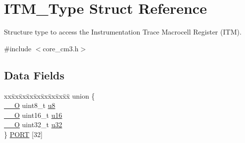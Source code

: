\hypertarget{struct_i_t_m___type}{}\section{I\+T\+M\+\_\+\+Type Struct Reference}
\label{struct_i_t_m___type}


Structure type to access the Instrumentation Trace Macrocell Register (I\+TM).  




{\ttfamily \#include $<$core\+\_\+cm3.\+h$>$}

\subsection*{Data Fields}
\begin{DoxyCompactItemize}
\item 
\begin{tabbing}
xx\=xx\=xx\=xx\=xx\=xx\=xx\=xx\=xx\=\kill
union \{\\
\>\mbox{\hyperlink{core__sc300_8h_a7e25d9380f9ef903923964322e71f2f6}{\_\_O}} uint8\_t \mbox{\hyperlink{struct_i_t_m___type_a0374c0b98ab9de6f71fabff7412df832}{u8}}\\
\>\mbox{\hyperlink{core__sc300_8h_a7e25d9380f9ef903923964322e71f2f6}{\_\_O}} uint16\_t \mbox{\hyperlink{struct_i_t_m___type_ae8d499140220fa6d4eab1da7262bf08e}{u16}}\\
\>\mbox{\hyperlink{core__sc300_8h_a7e25d9380f9ef903923964322e71f2f6}{\_\_O}} uint32\_t \mbox{\hyperlink{struct_i_t_m___type_acaf6d0e14a3d4b541c624913b4a1931e}{u32}}\\
\} \mbox{\hyperlink{struct_i_t_m___type_a85a40c43c0c3a77535a31a0aefc0fe76}{PORT}} \mbox{[}32\mbox{]}\\


\end{tabbing}
\end{DoxyCompactItemize}
